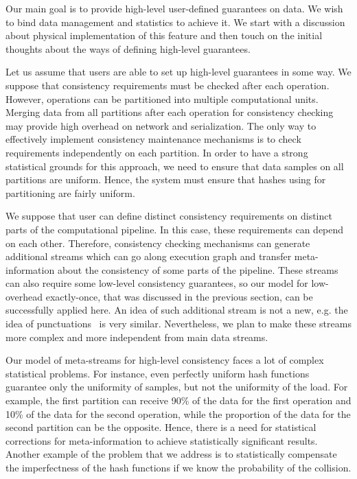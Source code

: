 \label{fs-phd-reliable}

Our main goal is to provide high-level user-defined guarantees on data. We wish to bind data management and statistics to achieve it. We start with a discussion about physical implementation of this feature and then touch on the initial thoughts about the ways of defining high-level guarantees.

Let us assume that users are able to set up high-level guarantees in some way. We suppose that consistency requirements must be checked after each operation. However, operations can be partitioned into multiple computational units. Merging data from all partitions after each operation for consistency checking may provide high overhead on network and serialization. The only way to effectively implement consistency maintenance mechanisms is to check requirements independently on each partition. In order to have a strong statistical grounds for this approach, we need to ensure that data samples on all partitions are uniform. Hence, the system must ensure that hashes using for partitioning are fairly uniform.

We suppose that user can define distinct consistency requirements on distinct parts of the computational pipeline. In this case, these requirements can depend on each other. Therefore, consistency checking mechanisms can generate additional streams which can go along execution graph and transfer meta-information about the consistency of some parts of the pipeline. These streams can also require some low-level consistency guarantees, so our model for low-overhead exactly-once, that was discussed in the previous section, can be successfully applied here. An idea of such additional stream is not a new, e.g. the idea of punctuations~\cite{Tucker:2003:EPS:776752.776780} is very similar. Nevertheless, we plan to make these streams more complex and more independent from main data streams.

Our model of meta-streams for high-level consistency faces a lot of complex statistical problems. For instance, even perfectly uniform hash functions guarantee only the uniformity of samples, but not the uniformity of the load. For example, the first partition can receive 90\% of the data for the first operation and 10\% of the data for the second operation, while the proportion of the data for the second partition can be the opposite. Hence, there is a need for statistical corrections for meta-information to achieve statistically significant results. Another example of the problem that we address is to statistically compensate the imperfectness of the hash functions if we know the probability of the collision.  

